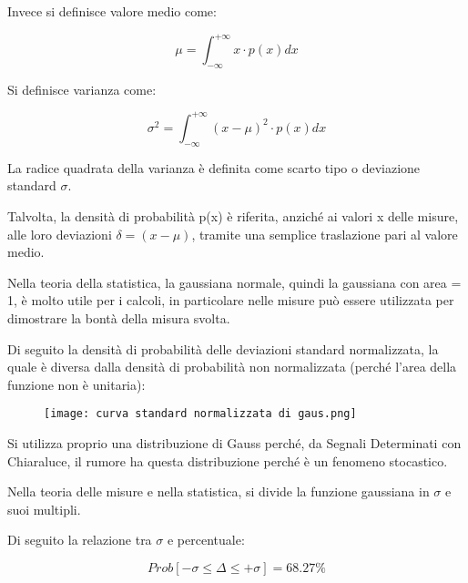 Invece si definisce valore medio come: 

{
    \Large 
    \begin{equation}
        \mu = \int_{- \infty}^{+ \infty} x \cdot p(x) dx
    \end{equation}
}

Si definisce varianza come: 

{
    \Large 
    \begin{equation}
        \sigma^{2}
        = 
        \int_{- \infty}^{+ \infty} 
        (x - \mu)^{2} \cdot p(x) dx
    \end{equation}
}

La radice quadrata della varianza è definita come scarto tipo o deviazione standard $\sigma$. \newline 

Talvolta, la densità di probabilità p(x) è riferita, anziché ai valori x delle misure, 
alle loro deviazioni $\delta = (x - \mu)$, tramite una semplice traslazione pari al valore medio. \newline 

Nella teoria della statistica, la gaussiana normale, quindi la gaussiana con area = 1, 
è molto utile per i calcoli, in particolare nelle misure può essere utilizzata per dimostrare la bontà della misura svolta. \newline 

Di seguito la densità di probabilità delle deviazioni standard normalizzata, la quale è diversa dalla densità di probabilità non normalizzata (perché l'area della funzione non è unitaria): 

\begin{figure}[h]
    \centering
    \texttt{[image: curva standard normalizzata di gaus.png]}
\end{figure}

\newpage 

Si utilizza proprio una distribuzione di Gauss perché, da Segnali Determinati con Chiaraluce, 
il rumore ha questa distribuzione perché è un fenomeno stocastico. \newline 

Nella teoria delle misure e nella statistica, si divide la funzione gaussiana in $\sigma$ e suoi multipli. \newline 

Di seguito la relazione tra $\sigma$ e percentuale: 

{
    \Large 
    \begin{equation}
        Prob[- \sigma \leq \Delta \leq + \sigma] = 68.27 \%
    \end{equation}
}

